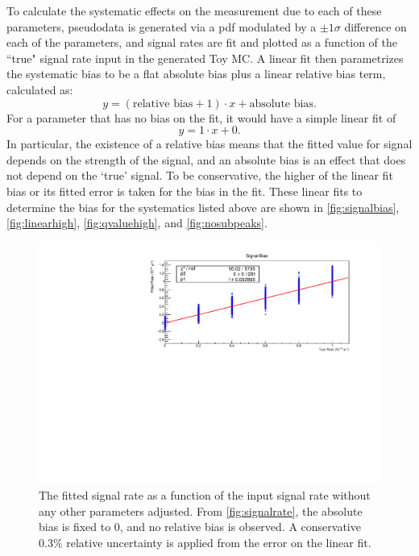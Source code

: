 To calculate the systematic effects on the measurement due to each of these parameters, pseudodata is generated via a pdf modulated by a $\pm1\sigma$ difference on each of the parameters, and signal rates are fit and plotted as a function of the ``true" signal rate input in the generated Toy MC.
A linear fit then parametrizes the systematic bias to be a flat absolute bias plus a linear relative bias term, calculated as:
\begin{equation}
y = (\textrm{relative bias}+1) \cdot x + \textrm{absolute bias}.
\end{equation}
For a parameter that has no bias on the fit, it would have a simple linear fit of 
\begin{equation}
y = 1\cdot x + 0.
\end{equation}
In particular, the existence of a relative bias means that the fitted value for signal depends on the strength of the signal, and an absolute bias is an effect that does not depend on the `true' signal.
To be conservative, the higher of the linear fit bias or its fitted error is taken for the bias in the fit.
These linear fits to determine the bias for the systematics listed above are shown in \autoref{fig:signalbias}, \autoref{fig:linearhigh}, \autoref{fig:qvaluehigh}, and \autoref{fig:nosubpeaks}.
\begin{figure}
\centering
\includegraphics[width=0.7\linewidth]{Figures/Appendix_Figures/SignalBias.pdf}
\caption[The fitted signal rate as a function of the input signal rate without any other parameters adjusted.]
{The fitted signal rate as a function of the input signal rate without any other parameters adjusted.
From \autoref{fig:signalrate}, the absolute bias is fixed to 0, and no relative bias is observed.
A conservative 0.3\% relative uncertainty is applied from the error on the linear fit.}
\label{fig:signalbias}
\end{figure}

